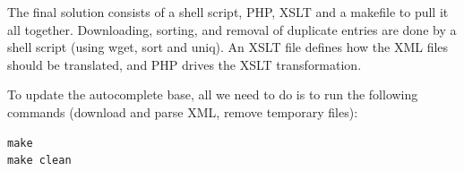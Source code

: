 		The final solution consists of a shell script, PHP, XSLT and a makefile
		to pull it all together.  Downloading, sorting, and removal of
		duplicate entries are done by a shell script (using wget, sort and
		uniq). An XSLT file defines how the XML files should be translated, and
		PHP drives the XSLT transformation.

		To update the autocomplete base, all we need to do is to run the
		following commands (download and parse XML, remove temporary files):
\begin{lstlisting}
make
make clean
\end{lstlisting}

